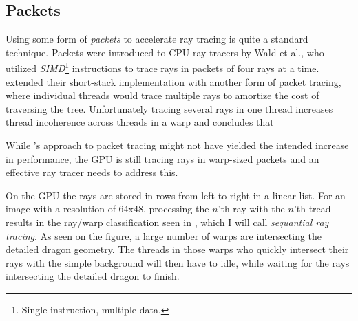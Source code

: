 \subsection{Packets}


Using some form of \textit{packets} to accelerate ray tracing is quite a
standard technique. Packets were introduced to CPU ray tracers by Wald et
al., who utilized \textit{SIMD}\footnote{Single
  instruction, multiple data.} instructions to trace rays in packets of four
rays at a time. \horn{} extended their short-stack implementation with another
form of packet tracing, where individual threads would trace multiple rays to
amortize the cost of traversing the tree. Unfortunately tracing several rays in
one thread increases thread incoherence across threads in a warp and \aila{}
concludes that




While \horn's approach to packet tracing might not have yielded the intended
increase in performance, the GPU is still tracing rays in warp-sized packets and
an effective ray tracer needs to address this.

On the GPU the rays are stored in rows from left to right in a linear list. For
an image with a resolution of 64x48, processing the $n$'th ray with the $n$'th
tread results in the ray/warp classification seen in
, which I will call \textit{sequantial ray
  tracing}. As seen on the figure, a large number of warps are intersecting the
detailed dragon geometry. The threads in those warps who quickly intersect their
rays with the simple background will then have to idle, while waiting for the
rays intersecting the detailed dragon to finish.

